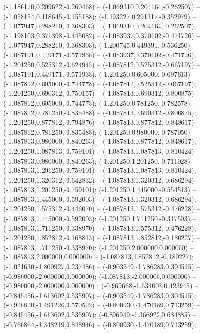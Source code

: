  (-1.186170,0.209622,-0.260468) -- (-1.069310,0.204164,-0.262507) -- (-1.058154,0.118645,-0.155188);
 (-1.193227,0.291317,-0.352979) -- (-1.077947,0.288210,-0.368303) -- (-1.069310,0.204164,-0.262507);
 (-1.198103,0.371398,-0.445082) -- (-1.083937,0.370102,-0.471726) -- (-1.077947,0.288210,-0.368303);
 (-1.200745,0.449391,-0.536250) -- (-1.087191,0.449171,-0.571938) -- (-1.083937,0.370102,-0.471726);
 (-1.201250,0.525312,-0.624945) -- (-1.087812,0.525312,-0.667197) -- (-1.087191,0.449171,-0.571938);
 (-1.201250,0.605000,-0.697613) -- (-1.087812,0.605000,-0.744778) -- (-1.087812,0.525312,-0.667197);
 (-1.201250,0.690312,-0.750157) -- (-1.087813,0.690312,-0.800875) -- (-1.087812,0.605000,-0.744778);
 (-1.201250,0.781250,-0.782578) -- (-1.087812,0.781250,-0.835488) -- (-1.087813,0.690312,-0.800875);
 (-1.201250,0.877812,-0.794876) -- (-1.087813,0.877812,-0.848617) -- (-1.087812,0.781250,-0.835488);
 (-1.201250,0.980000,-0.787050) -- (-1.087813,0.980000,-0.840263) -- (-1.087813,0.877812,-0.848617);
 (-1.201250,1.087813,-0.759101) -- (-1.087813,1.087813,-0.810424) -- (-1.087813,0.980000,-0.840263);
 (-1.201250,1.201250,-0.711028) -- (-1.087813,1.201250,-0.759101) -- (-1.087813,1.087813,-0.810424);
 (-1.201250,1.320312,-0.642832) -- (-1.087813,1.320312,-0.686294) -- (-1.087813,1.201250,-0.759101);
 (-1.201250,1.445000,-0.554513) -- (-1.087813,1.445000,-0.592003) -- (-1.087813,1.320312,-0.686294);
 (-1.201250,1.575312,-0.446070) -- (-1.087813,1.575312,-0.476228) -- (-1.087813,1.445000,-0.592003);
 (-1.201250,1.711250,-0.317503) -- (-1.087813,1.711250,-0.338970) -- (-1.087813,1.575312,-0.476228);
 (-1.201250,1.852812,-0.168813) -- (-1.087813,1.852812,-0.180227) -- (-1.087813,1.711250,-0.338970);
 (-1.201250,2.000000,0.000000) -- (-1.087813,2.000000,0.000000) -- (-1.087813,1.852812,-0.180227);
 (-1.021630,-1.800927,0.237486) -- (-0.903549,-1.786283,0.304515) -- (-0.980000,-2.000000,0.000000);
 (-1.087813,-2.000000,0.000000) -- (-0.980000,-2.000000,0.000000) ;
 (-0.969668,-1.634003,0.423945) -- (-0.845456,-1.613602,0.535907) -- (-0.903549,-1.786283,0.304515);
 (-0.928820,-1.491226,0.570522) -- (-0.800930,-1.470189,0.713259) -- (-0.845456,-1.613602,0.535907);
 (-0.896949,-1.366922,0.684885) -- (-0.766864,-1.348219,0.848946) -- (-0.800930,-1.470189,0.713259);
